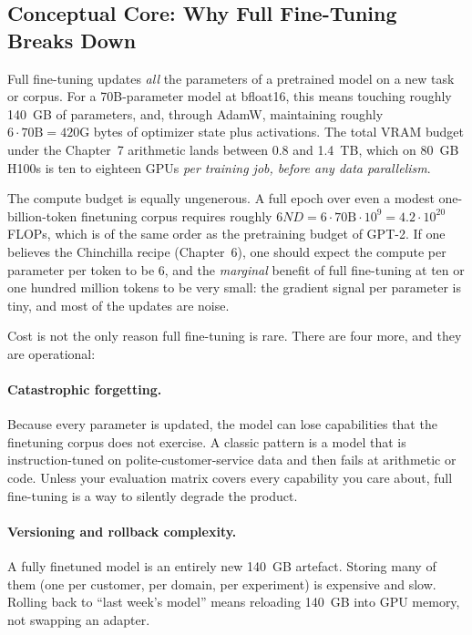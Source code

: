 \subsection{Conceptual Core: Why Full Fine-Tuning Breaks Down}

Full fine-tuning updates \emph{all} the parameters of a pretrained model on
a new task or corpus. For a 70B-parameter model at bfloat16, this means
touching roughly 140~GB of parameters, and, through AdamW, maintaining
roughly $6\cdot 70\text{B} = 420\text{G}$ bytes of optimizer state plus
activations.
The total VRAM budget under the Chapter~7 arithmetic lands between 0.8 and
1.4~TB, which on 80~GB H100s is ten to eighteen GPUs \emph{per training
job, before any data parallelism}.

The compute budget is equally ungenerous. A full epoch over even a
modest one-billion-token finetuning corpus requires roughly $6ND =
6\cdot 70\text{B}\cdot 10^9 = 4.2\cdot 10^{20}$ FLOPs, which is of the
same order as the pretraining budget of GPT-2.
If one believes the Chinchilla recipe (Chapter~6), one should expect the
compute per parameter per token to be $6$, and the \emph{marginal}
benefit of full fine-tuning at ten or one hundred million tokens to be
very small: the gradient signal per parameter is tiny, and most of the
updates are noise.

Cost is not the only reason full fine-tuning is rare. There are four
more, and they are operational:

\paragraph{Catastrophic forgetting.}
Because every parameter is updated, the model can lose capabilities
that the finetuning corpus does not exercise. A classic pattern is a
model that is instruction-tuned on polite-customer-service data and
then fails at arithmetic or code. Unless your evaluation matrix covers
every capability you care about, full fine-tuning is a way to silently
degrade the product.

\paragraph{Versioning and rollback complexity.}
A fully finetuned model is an entirely new 140~GB artefact. Storing
many of them (one per customer, per domain, per experiment) is
expensive and slow. Rolling back to ``last week's model'' means
reloading 140~GB into GPU memory, not swapping an adapter.

